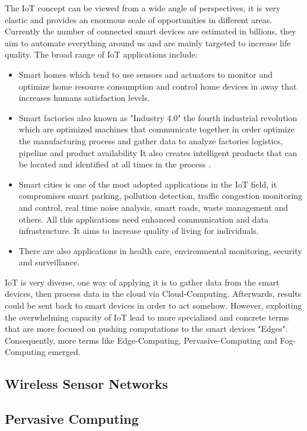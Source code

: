 The IoT concept can be viewed from a wide angle of perspectives, it is very elastic and provides an enormous scale of opportunities in different areas. Currently the number of connected smart devices are estimated in billions, they aim to automate everything around us and are mainly targeted to increase life quality. The broad range of IoT applications include:
\begin{itemize}
\item Smart homes which tend to use sensors and actuators to monitor and optimize home resource consumption and control home devices in away that increases humans satisfaction levels. 
\item Smart factories also known as "Industry 4.0" the fourth industrial revolution which are optimized machines that communicate together in order optimize the manufacturing process and gather data to analyze factories logistics, pipeline and product availability It also creates intelligent products that can be located and identified at all times in the process \cite{Gilchrist:2016:III:2994178}.

\item Smart cities is one of the most adopted applications in the IoT field, it compromises smart parking,  pollution detection, traffic congestion monitoring and control, real time noise analysis, smart roads, waste management and others.  All this applications need enhanced communication and data infrastructure. It aims to increase quality of living for individuals.

\item There are also applications in  health care, environmental monitoring, security and surveillance.
\end{itemize}

IoT is very diverse, one way of applying it is to gather data from the smart devices, then process data in the cloud via Cloud-Computing. Afterwards, results could be sent back to smart devices in order to act somehow. However, exploiting the overwhelming capacity of IoT lead to more specialized and concrete terms that are more focused on pushing computations to the smart devices "Edges". Consequently, more terms like Edge-Computing, Pervasive-Computing and Fog-Computing emerged.


\subsection{ Wireless Sensor Networks}

\subsection{Pervasive Computing} 

